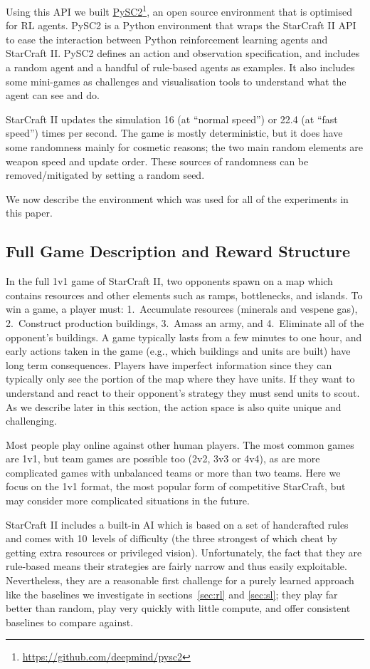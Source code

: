 \documentclass{article}
\newcommand{\footref}[2]{\href{#1}{#2}\footnote{\url{#1}}}
\begin{document}
Using this API we built \footref{https://github.com/deepmind/pysc2}{PySC2}, an open source environment that is optimised for RL agents. PySC2 is a Python environment that wraps the StarCraft II API to ease the interaction between Python reinforcement learning agents and StarCraft II. PySC2 defines an action and observation specification, and includes a random agent and a handful of rule-based agents as examples. It also includes some mini-games as challenges and visualisation tools to understand what the agent can see and do.

StarCraft II updates the simulation 16 (at ``normal speed'') or 22.4 (at ``fast speed'') times per second.
The game is mostly deterministic, but it does have some randomness mainly for cosmetic reasons; the two main random elements are weapon speed and update order. These sources of randomness can be removed/mitigated by setting a random seed.

We now describe the environment which was used for all of the experiments in this paper.

\subsection{Full Game Description and Reward Structure}

In the full 1v1 game of StarCraft II, two opponents spawn on a map which contains resources and other elements such as ramps, bottlenecks, and islands. To win a game, a player must: 1.\ Accumulate resources (minerals and vespene gas), 2.\ Construct production buildings, 3.\ Amass an army, and 4.\ Eliminate all of the opponent's buildings. A game typically lasts from a few minutes to one hour, and early actions taken in the game (e.g., which buildings and units are built) have long term consequences. Players have imperfect information since they can typically only see the portion of the map where they have units. If they want to understand and react to their opponent's strategy they must send units to scout. As we describe later in this section, the action space is also quite unique and challenging.

Most people play online against other human players. The most common games are 1v1, but team games are possible too (2v2, 3v3 or 4v4), as are more complicated games with unbalanced teams or more than two teams. Here we focus on the 1v1 format, the most popular form of competitive StarCraft, but may consider more complicated situations in the future.

StarCraft II includes a built-in AI which is based on a set of handcrafted rules and comes with 10~levels of difficulty (the three strongest of which cheat by getting extra resources or privileged vision). Unfortunately, the fact that they are rule-based means their strategies are fairly narrow and thus easily exploitable. Nevertheless, they are a reasonable first challenge for a purely learned approach like the baselines we investigate in sections~\ref{sec:rl} and \ref{sec:sl}; they play far better than random, play very quickly with little compute, and offer consistent baselines to compare against. 
\end{document}
